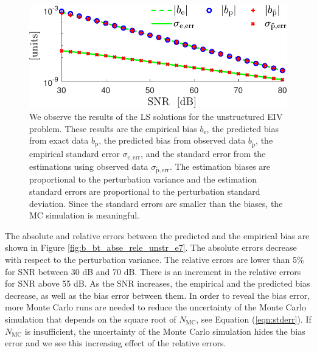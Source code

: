 \begin{figure}[htb!]
 \centering
 \includegraphics[width=0.69\columnwidth]{./ChapterStatisticalAnalysis/fig/Fig_2.pdf} 
  \caption{ \label{fig:bias_sigma_NMC_unstr_str_n2} 
  We observe the results of the LS solutions \color{blue} for the unstructured EIV problem\color{black}. These results are the empirical bias $b_{\mathrm{e}}$, the predicted bias from exact data $b_{\mathrm{p}}$, the predicted bias from observed data $b_{\widetilde{\mathrm{p}}}$, the empirical standard error $\sigma_{\mathrm{e, err}}$, and the standard error from the estimations using observed data $\sigma_{\widetilde{\mathrm{p}}, \mathrm{err}}$. The estimation biases are proportional to the perturbation variance and the estimation standard errors are proportional to the perturbation standard deviation. Since the standard errors are smaller than the biases, the MC simulation is meaningful. }
\end{figure}

The absolute and relative errors between the predicted and the empirical bias are shown in Figure \ref{fig:b_bt_abse_rele_unstr_e7}. 
The absolute errors decrease with respect to the perturbation variance.
The relative errors are lower than 5\% for SNR between 30 dB and 70 dB. 
There is an increment in the relative errors for SNR above 55 dB. 
 As the SNR increases, the empirical and the predicted bias decrease, as well as the bias error between them.
In order to reveal the bias error, more Monte Carlo runs are needed to reduce the uncertainty of the Monte Carlo simulation that depends on the square root of $N_{\mathrm{MC}}$, see Equation (\ref{eqn:stderr}).
If $N_{\mathrm{MC}}$ is insufficient, the uncertainty of the Monte Carlo simulation hides the bias error and we see this increasing effect of the relative errors. 

